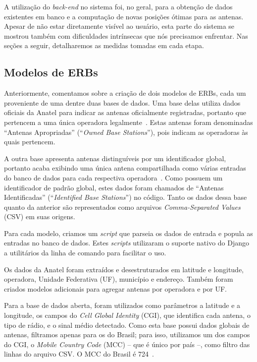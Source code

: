 \documentclass[]{politex}
\begin{document}
A utilização do \textit{back-end} no sistema foi, no geral, para a obtenção de
dados existentes em banco e a computação de novas posições ótimas para as antenas.
Apesar de não estar diretamente visível ao usuário, esta parte do sistema se
mostrou também com dificuldades intrínsecas que nós precisamos enfrentar. Nas
seções a seguir, detalharemos as medidas tomadas em cada etapa.

\subsection{Modelos de ERBs}

Anteriormente, comentamos sobre a criação de dois modelos de ERBs, cada um
proveniente de uma dentre duas bases de dados. Uma base delas utiliza
dados oficiais da Anatel para indicar as antenas oficialmente registradas,
portanto que pertencem a uma única operadora legalmente~\cite{mapa-erb}.
Estas antenas foram denominadas ``Antenas Apropriadas'' (``\textit{Owned Base
Stations}''), pois indicam as operadoras às quais pertencem.

A outra base apresenta antenas distinguíveis por um identificador global,
portanto acaba exibindo uma única antena compartilhada como várias entradas do
banco de dados para cada respectiva operadora~\cite{opencellid}. Como possuem um
identificador de padrão global, estes dados foram chamados de ``Antenas
Identificadas'' (``\textit{Identified Base Stations}'') no código. Tanto os
dados dessa base quanto da anterior são representados como arquivos
\textit{Comma-Separated Values} (CSV) em suas origens.

Para cada modelo, criamos um \textit{script} que parseia os dados de entrada e
popula as entradas no banco de dados. Estes \textit{scripts} utilizaram o
suporte nativo do Django a utilitários da linha de comando para facilitar o
uso.

Os dados da Anatel foram extraídos e desestruturados em latitude e longitude,
operadora, Unidade Federativa (UF), município e endereço. Também foram criados
modelos adicionais para agregar antenas por operadora e por UF.

Para a base de dados aberta, foram utilizados como parâmetros a latitude e a
longitude, os campos do \textit{Cell Global Identity} (CGI), que identifica cada
antena, o tipo de rádio, e o sinal médio detectado. Como esta base possui dados
globais de antenas, filtramos apenas para os do Brasil; para isso, utilizamos
um dos campos do CGI, o \textit{Mobile Country Code} (MCC) -- que é único por
país --, como filtro das linhas do arquivo CSV. O MCC do Brasil é 724~\cite{mcc-mnc}.
\end{document}
